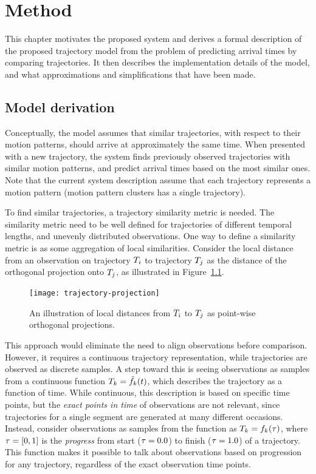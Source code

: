 \chapter{Method}\label{cha:method}
This chapter motivates the proposed system and derives a formal
description of the proposed trajectory model from the problem of
predicting arrival times by comparing trajectories. 
It then describes the implementation details of the model, and what
approximations and simplifications that have been made.

\section{Model derivation}
Conceptually, the model assumes that similar trajectories, with
respect to their motion patterns, should arrive at 
approximately the same time. When presented with a new trajectory, the system
finds previously observed trajectories with similar motion patterns,
and predict arrival times based on the most similar ones. Note that the current
system description assume that each trajectory represents
a motion pattern (motion pattern clusters has a single trajectory).

To find similar trajectories, a trajectory similarity metric 
is needed. The similarity metric need to be well defined for
trajectories of different temporal lengths, and unevenly
distributed observations. One way to define a similarity metric is as some aggregation of
local similarities. Consider the local distance from an observation on trajectory
$T_{i}$ to trajectory $T_{j}$ as the distance of the orthogonal
projection onto $T_{j}$, as illustrated in Figure~\ref{fig:trajectory-projection}.
\begin{figure}
  \centering
  \texttt{[image: trajectory-projection]}
  \caption{An illustration of local distances from $T_i$ to
  $T_j$ as point-wise orthogonal projections.}\label{fig:trajectory-projection}
\end{figure}
This approach would eliminate the need to align observations before
comparison. However, it requires a continuous trajectory
representation, while trajectories are observed as discrete samples.
A step toward this is seeing observations as samples from a continuous function
$T_{k} = \tilde{f}_{k}(t)$, which describes the trajectory as a function of
time. While continuous, this description is based on specific time
points, but the \textit{exact points in time} of observations are not
relevant, since trajectories for a single segment are generated at many different
occasions. Instead, consider observations as samples from the function
as $T_{k} = f_{k}(\tau)$, where $\tau = [0, 1]$ 
is the \textit{progress} from start ($\tau = 0.0$) to finish ($\tau = 1.0$) 
of a trajectory. This function makes it possible to talk about observations based on
progression for any trajectory, regardless of the exact observation
time points. 

